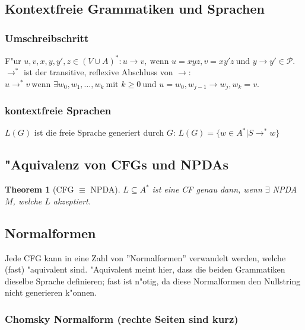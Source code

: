 \documentclass[german, 10pt, a4paper, twocolumn]{scrartcl}
\newtheorem{theorem}{Theorem}[section]
\theoremstyle{definition}
\theoremstyle{example}
\begin{document}
\subsection{Kontextfreie Grammatiken und Sprachen}

\subsubsection{Umschreibschritt}

F"ur $u,v,x,y,y',z \in (V\cup A)^*: u \rightarrow v,\ \mbox{wenn } u=xyz, v= xy'z\ \mbox{und } y \rightarrow y'\in \mathcal{P}$.\\

$\rightarrow^*$ ist der transitive, reflexive Abschluss von $\rightarrow$: $u \rightarrow^* v\ \mbox{wenn } \exists w_0,w_1,\ldots,w_k\ \mbox{mit } k\geq 0\ \mbox{und } u=w_0, w_{j-1}\rightarrow w_j, w_k =v$.

\subsubsection{kontextfreie Sprachen}

$L(G)$ ist die freie Sprache generiert durch $G$: $L(G) = \{ w \in A^* | S \rightarrow^* w \}$

\subsection{"Aquivalenz von CFGs und NPDAs}

\begin{theorem}[CFG $\equiv$ NPDA]
	$L \subseteq A^*$ ist eine CF genau dann, wenn $\exists$ NPDA $M$, welche $L$ akzeptiert.
\end{theorem}

\subsection{Normalformen}

Jede CFG kann in eine Zahl von ''Normalformen'' verwandelt werden, welche (fast) "aquivalent sind. "Aquivalent meint hier, dass die beiden Grammatiken dieselbe Sprache definieren; fast ist n"otig, da diese Normalformen den Nullstring nicht generieren k"onnen.

\subsubsection{Chomsky Normalform (rechte Seiten sind kurz)}
\end{document}
